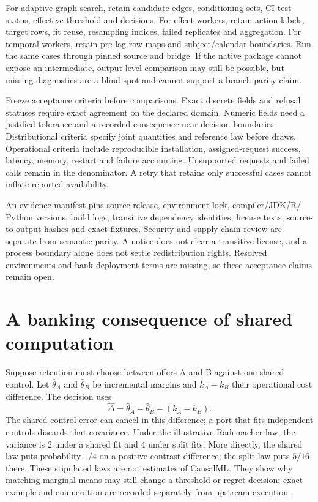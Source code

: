 For adaptive graph search, retain candidate edges, conditioning sets, CI-test
status, effective threshold and decisions. For effect workers, retain action
labels, target rows, fit reuse, resampling indices, failed replicates and
aggregation. For temporal workers, retain pre-lag row maps and subject/calendar
boundaries. Run the same cases through pinned source and bridge. If the native
package cannot expose an intermediate, output-level comparison may still be
possible, but missing diagnostics are a blind spot and cannot support a branch
parity claim.

Freeze acceptance criteria before comparisons. Exact discrete fields and
refusal statuses require exact agreement on the declared domain. Numeric fields
need a justified tolerance and a recorded consequence near decision
boundaries. Distributional criteria specify joint quantities and reference
law before draws. Operational criteria include reproducible installation,
assigned-request success, latency, memory, restart and failure accounting.
Unsupported requests and failed calls remain in the denominator. A retry that
retains only successful cases cannot inflate reported availability.

An evidence manifest pins source release, environment lock, compiler/JDK/R/
Python versions, build logs, transitive dependency identities, license texts,
source-to-output hashes and exact fixtures. Security and supply-chain review
are separate from semantic parity. A notice does not clear a transitive
license, and a process boundary alone does not settle redistribution rights.
Resolved environments and bank deployment terms are missing, so these
acceptance claims remain open.

\section{A banking consequence of shared computation}

Suppose retention must choose between offers A and B against one shared
control. Let $\widehat\theta_A$ and $\widehat\theta_B$ be incremental margins
and $k_A-k_B$ their operational cost difference. The decision uses
\[
  \widehat\Delta=\widehat\theta_A-\widehat\theta_B-(k_A-k_B).
\]
The shared control error can cancel in this difference; a port that fits
independent controls discards that covariance. Under the illustrative
Rademacher law, the variance is 2 under a shared fit and 4 under split fits.
More directly, the shared law puts probability $1/4$ on a positive contrast
difference; the split law puts $5/16$ there. These stipulated laws are not
estimates of CausalML. They show why matching marginal means may still change
a threshold or regret decision; exact example and enumeration are recorded
separately from upstream execution \citep{exec17_s9_bank_oracle}.

